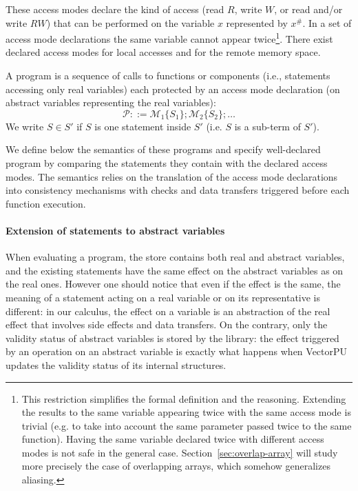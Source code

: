 \documentclass[preprint,12pt]{elsarticle}
\newcommand{\abs}[1]{#1^\#}
\newcommand{\AM}{\mathcal{M}}
\newcommand{\Prog}{\mathcal{P}}
\begin{document}
These access modes declare the kind of access (read $R$, write $W$, or read and/or write 
$RW$) that 
can be performed on the variable $x$ represented by $\abs x$. In a set 
of access mode declarations the same variable cannot appear twice\footnote{This restriction simplifies the formal definition and the reasoning. Extending the results to the same variable appearing twice with the same access mode is trivial (e.g. to take into account the same parameter passed twice to the same function). Having the same variable declared twice with different access modes is not safe in the general case. Section~\ref{sec:overlap-array} will study more precisely the case of overlapping arrays, which somehow generalizes aliasing.}. There exist declared 
access modes for  local accesses and for  the 
remote memory space.

A program is a sequence of calls to functions or components (i.e., statements accessing 
only real variables) 
each protected by an access 
mode declaration (on abstract variables representing the real variables):
\[\Prog::=\AM_1\{S_1\};\AM_2\{S_2\};\ldots\]
We write  $S\in S'$ if $S$ is one statement inside $S'$ (i.e. $S$ is a sub-term of 
$S'$).

We  define below the semantics of these programs  and specify well-declared program by 
comparing the statements they contain with 
the declared access modes. The semantics relies on the translation of 
the access mode declarations into consistency mechanisms 
with checks and data transfers 
triggered 
before each function 
execution.


\paragraph{Extension of statements to abstract variables}
When evaluating a program, the store contains both real and abstract variables, and the 
existing 
statements have the same effect on the abstract variables as on the real ones. However 
one should notice that 
even if the effect is the same, the meaning of a statement acting on a real variable 
or on its representative is different: in our calculus, the effect on a variable is an 
abstraction of the real effect that involves side effects and data transfers. On the 
contrary, only the validity status of abstract variables is stored by the library: the 
effect triggered by an operation on an abstract variable is exactly what happens when 
VectorPU updates the validity status of its internal structures.
\end{document}
